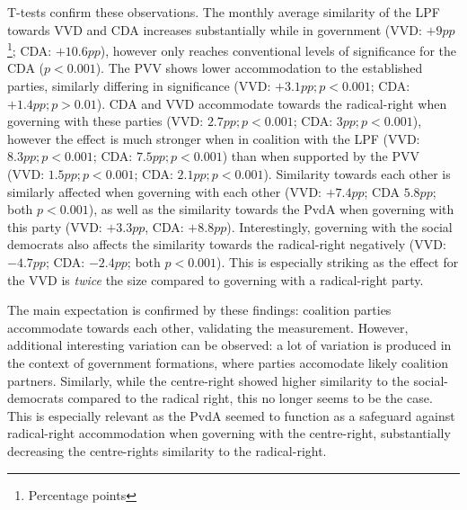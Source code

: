 \documentclass{article}
\begin{document}
T-tests confirm these observations. The monthly average similarity of the LPF towards VVD and CDA increases substantially while in government (VVD: $+9pp$\footnote{Percentage points}; CDA: $+10.6pp$), however only reaches conventional levels of significance for the CDA ($p < 0.001$). The PVV shows lower accommodation to the established parties, similarly differing in significance (VVD: $+3.1pp; p < 0.001$; CDA: $+1.4pp; p > 0.01$). CDA and VVD accommodate towards the radical-right when governing with these parties (VVD: $2.7pp; p < 0.001$; CDA: $3pp; p < 0.001$), however the effect is much stronger when in coalition with the LPF (VVD: $8.3pp; p < 0.001$; CDA: $7.5pp; p < 0.001$) than when supported by the PVV (VVD: $1.5pp; p< 0.001$; CDA: $2.1pp; p< 0.001$). Similarity towards each other is similarly affected when governing with each other (VVD: $+7.4pp$; CDA $5.8pp$; both $p < 0.001$), as well as the similarity towards the PvdA when governing with this party (VVD: $+3.3pp$, CDA: $+8.8pp$). Interestingly, governing with the social democrats also affects the similarity towards the radical-right negatively (VVD: $-4.7pp$; CDA: $-2.4pp$; both $p<0.001$). This is especially striking as the effect for the VVD is \textit{twice} the size compared to governing with a radical-right party. \par

The main expectation is confirmed by these findings: coalition parties accommodate towards each other, validating the measurement. However, additional interesting variation can be observed: a lot of variation is produced in the context of government formations, where parties accomodate likely coalition partners. Similarly, while the centre-right showed higher similarity to the social-democrats compared to the radical right, this no longer seems to be the case. This is especially relevant as the PvdA seemed to function as a safeguard against radical-right accommodation when governing with the centre-right, substantially decreasing the centre-rights similarity to the radical-right.

\newpage
\end{document}
